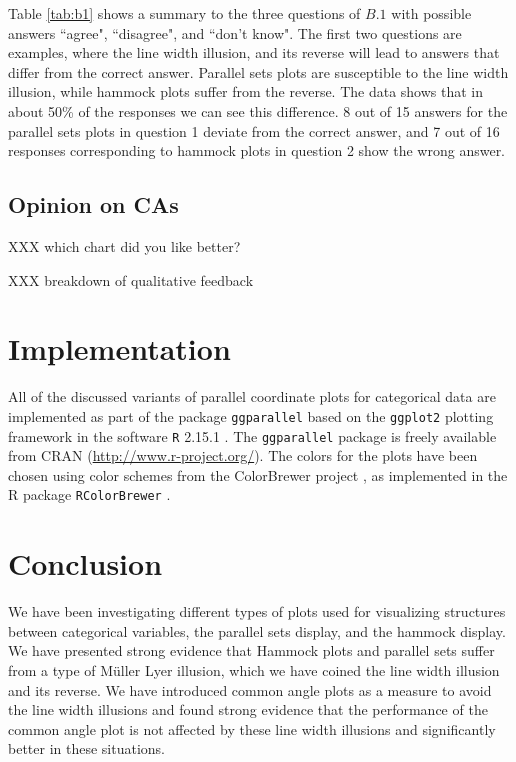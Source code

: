 Table \ref{tab:b1} shows a summary to the  three questions of $B.1$ with possible answers ``agree", ``disagree", and ``don't know".
The first two questions are  examples, where the line width illusion, and its reverse will lead to answers that differ from the correct answer. Parallel sets plots are susceptible to the line width illusion, while hammock plots suffer from the reverse. The data shows that in about 50\% of the responses we can see this difference. 8 out of 15 answers for the parallel sets plots in question 1 deviate from the correct answer, and 7 out of 16 responses corresponding to hammock plots in question 2 show the wrong answer.


\subsection*{Opinion on CAs}
XXX which chart did you like better?

XXX breakdown of qualitative feedback



\section{Implementation}

All  of the discussed variants of parallel coordinate plots for categorical data are implemented as part of the package {\tt ggparallel} based on the {\tt ggplot2} \cite{ggplot2} plotting framework in the software {\tt R} 2.15.1 \citep{R}. The  {\tt ggparallel} package is freely available from CRAN (\url{http://www.r-project.org/}).
The colors for the plots have been chosen using color schemes from the ColorBrewer project  \cite{colorbrewer} , as implemented in the R package {\tt RColorBrewer}  \cite{RColorBrewer} .


\section{Conclusion}
%
We have been investigating different types of plots used for visualizing structures between categorical variables, the parallel sets display, and the hammock display.
We have presented strong evidence that Hammock plots and parallel sets suffer from a type of M\"uller Lyer illusion, which we have coined the line width illusion and its reverse. 
We have introduced common angle plots as a measure to avoid the line width illusions and found strong evidence that  the performance of the common angle plot is not affected by these line width illusions and significantly better in these situations.



